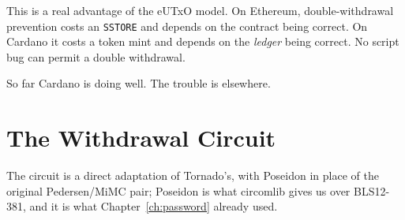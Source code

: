 \begin{highlight}
This is a real advantage of the eUTxO model. On Ethereum, double-withdrawal
prevention costs an \texttt{SSTORE} and depends on the contract being correct.
On Cardano it costs a token mint and depends on the \emph{ledger} being correct.
No script bug can permit a double withdrawal.
\end{highlight}

So far Cardano is doing well. The trouble is elsewhere.

\section{The Withdrawal Circuit} \label{sec:ch8-circuit}

The circuit is a direct adaptation of Tornado's, with Poseidon in place of the
original Pedersen/MiMC pair; Poseidon is what circomlib gives us over
BLS12-381, and it is what Chapter~\ref{ch:password} already used.

